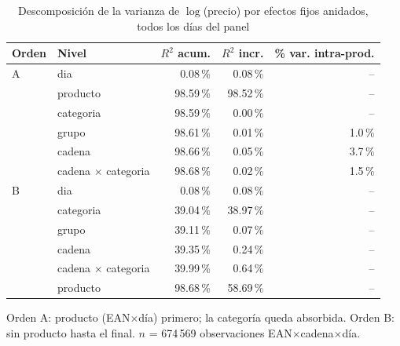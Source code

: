 \begin{table}[htbp]
\caption{Descomposici\'on de la varianza de $\log$(precio) por efectos fijos anidados, todos los d\'ias del panel}
\label{tab:varianza}
\centering\scriptsize\setlength{\tabcolsep}{3pt}
\begin{tabular}{@{}llrrr@{}}
\toprule
Orden & Nivel & $R^2$ acum. & $R^2$ incr. & \% var. intra-prod. \\
\midrule
A & dia & 0.08\,\% & 0.08\,\% & -- \\
 & producto & 98.59\,\% & 98.52\,\% & -- \\
 & categoria & 98.59\,\% & 0.00\,\% & -- \\
 & grupo & 98.61\,\% & 0.01\,\% & 1.0\,\% \\
 & cadena & 98.66\,\% & 0.05\,\% & 3.7\,\% \\
 & cadena $\times$ categoria & 98.68\,\% & 0.02\,\% & 1.5\,\% \\
\midrule
B & dia & 0.08\,\% & 0.08\,\% & -- \\
 & categoria & 39.04\,\% & 38.97\,\% & -- \\
 & grupo & 39.11\,\% & 0.07\,\% & -- \\
 & cadena & 39.35\,\% & 0.24\,\% & -- \\
 & cadena $\times$ categoria & 39.99\,\% & 0.64\,\% & -- \\
 & producto & 98.68\,\% & 58.69\,\% & -- \\
\bottomrule\end{tabular}
\par\smallskip\raggedright\scriptsize Orden A: producto (EAN$\times$d\'ia) primero; la categor\'ia queda absorbida. Orden B: sin producto hasta el final. $n$ = 674\,569 observaciones EAN$\times$cadena$\times$d\'ia.
\end{table}
